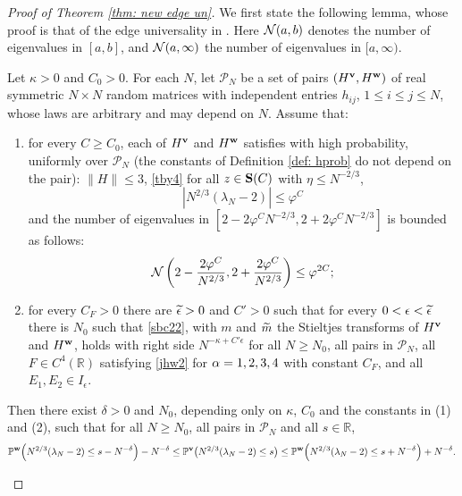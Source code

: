 \begin{proof}[Proof of Theorem \ref{thm: new edge un}]
We first state the following lemma, whose proof is that of the edge universality in \cite{EYY}. Here $\mathcal{N}(a,b)$ denotes the number of eigenvalues in $[a,b]$, and $\mathcal{N}(a,\infty)$ the number of eigenvalues in $[a,\infty)$.

\begin{lem}\label{lem: edge un str}
Let $\kappa>0$ and $C_0>0$. For each $N$, let ${\mathcal P}_N$ be a set of pairs $(H^{\mathbf{v}},H^{\mathbf{w}})$ of real symmetric $N\times N$ random matrices with independent entries $h_{ij}$, $1\le i\le j\le N$, whose laws are arbitrary and may depend on $N$. Assume that:
\begin{enumerate}
\item for every $C\ge C_0$, each of $H^{\mathbf{v}}$ and $H^{\mathbf{w}}$ satisfies with high probability, uniformly over ${\mathcal P}_N$ (the constants of Definition \ref{def: hprob} do not depend on the pair): $\|H\|\le3$, \eqref{tby4} for all $z\in{\bf S}(C)$ with $\eta\le N^{-2/3}$,
\begin{equation} \label{hh1}
|N^{2/3} (\lambda_N - 2) | \leq \varphi^C
\end{equation}
and the number of eigenvalues in $[2 -  2 \varphi^C N^{-2/3}, 2 +  2 \varphi^C N^{-2/3}]$ is bounded as follows:
\begin{equation}\label{hh2}
\mathcal{N} \left( 2 - \frac{2 \varphi^C}{N^{2/3}}, 2 + \frac{2 \varphi^C}{N^{2/3}} \right) \leq \varphi^{2C} ;
\end{equation}
\item for every $C_F>0$ there are $\widetilde\epsilon>0$ and $C'>0$ such that for every $0<\epsilon<\widetilde\epsilon$ there is $N_0$ such that \eqref{sbc22}, with $m$ and $\widetilde m$ the Stieltjes transforms of $H^{\mathbf{v}}$ and $H^{\mathbf{w}}$, holds with right side $N^{-\kappa+C'\epsilon}$ for all $N\ge N_0$, all pairs in ${\mathcal P}_N$, all $F\in C^4(\mathbb R)$ satisfying \eqref{jhw2} for $\alpha=1,2,3,4$ with constant $C_F$, and all $E_1,E_2\in I_\epsilon$.
\end{enumerate}
Then there exist $\delta>0$ and $N_0$, depending only on $\kappa$, $C_0$ and the constants in (1) and (2), such that for all $N\ge N_0$, all pairs in ${\mathcal P}_N$ and all $s\in\mathbb R$,
\begin{equation} \label{qset15}
\mathbb{P}^{\mathbf{w}} \Big( N^{2/3} (\lambda_N -2) \leq s - N^{-\delta} \Big) - N^{-\delta} \leq \mathbb{P}^{\mathbf{v}} \big( N^{2/3} (\lambda_N -2) \leq s \big) \leq \mathbb{P}^{\mathbf{w}} \Big( N^{2/3} (\lambda_N -2) \leq s + N^{-\delta} \Big) + N^{-\delta}.
\end{equation}
\end{lem}


\end{proof}
